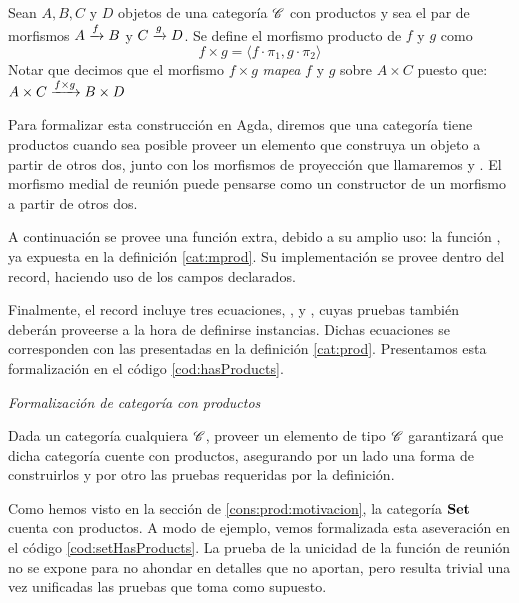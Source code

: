 \begin{definition}\label{cat:mprod}
Sean $A, B, C$ y $D$ objetos de una categoría $\mathscr{C}$ con productos y sea el par de morfismos $ A\xrightarrow{f}B$ y $ C\xrightarrow{g}D$. Se define el morfismo producto de $f$ y $g$ como
    $$f\times g = \langle f\cdot\pi_1, g\cdot \pi_2 \rangle$$
Notar que decimos que el morfismo $f \times g$ {\it mapea} $f$ y $g$ sobre $A \times C$ puesto que:
$ A\times C\xrightarrow{f \times g}B\times D$
\end{definition}

Para formalizar esta construcción en Agda, diremos que una categoría tiene productos cuando sea posible proveer un elemento  que construya un objeto a partir de otros dos, junto con los morfismos de proyección que llamaremos  y .
El morfismo medial de reunión  puede pensarse como un constructor de un morfismo a partir de otros dos.

A continuación se provee una función extra, debido a su amplio uso: la función , ya expuesta en la definición \ref{cat:mprod}. Su implementación se provee dentro del record, haciendo uso de los campos declarados.

Finalmente, el record incluye tres ecuaciones, ,  y , cuyas pruebas también deberán proveerse a la hora de definirse instancias. Dichas ecuaciones se corresponden con las presentadas en la definición \ref{cat:prod}. Presentamos esta formalización en el código \ref{cod:hasProducts}.

\begin{agdacode}{\it Formalización de categoría con productos} \label{cod:hasProducts}

\end{agdacode}

Dada un categoría cualquiera $\mathscr{C}$, proveer un elemento de tipo  $\mathscr{C}$ garantizará que dicha categoría cuente con productos, asegurando por un lado una forma de construirlos y por otro las pruebas requeridas por la definición. 

Como hemos visto en la sección de \ref{cons:prod:motivacion}, la categoría $\mathbf{Set}$ cuenta con productos. 
A modo de ejemplo, vemos formalizada esta aseveración en el código \ref{cod:setHasProducts}. La prueba de la unicidad de la función de reunión no se expone para no ahondar en detalles que no aportan, pero resulta trivial una vez unificadas las pruebas que toma como supuesto.

